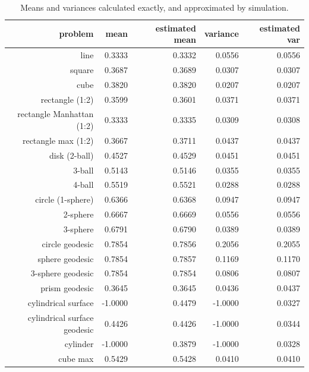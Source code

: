 \begin{table}[ht]
  \centering
  \begin{tabular}{r|rrrr}
                  problem &     mean & estimated mean & variance &  estimated var \\
     \hline 
                     line &   0.3333 &         0.3332 &   0.0556 &         0.0556 \\
                   square &   0.3687 &         0.3689 &   0.0307 &         0.0307 \\
                     cube &   0.3820 &         0.3820 &   0.0207 &         0.0207 \\
          rectangle (1:2) &   0.3599 &         0.3601 &   0.0371 &         0.0371 \\
rectangle Manhattan (1:2) &   0.3333 &         0.3335 &   0.0309 &         0.0308 \\
      rectangle max (1:2) &   0.3667 &         0.3711 &   0.0437 &         0.0437 \\
            disk (2-ball) &   0.4527 &         0.4529 &   0.0451 &         0.0451 \\
                   3-ball &   0.5143 &         0.5146 &   0.0355 &         0.0355 \\
                   4-ball &   0.5519 &         0.5521 &   0.0288 &         0.0288 \\
        circle (1-sphere) &   0.6366 &         0.6368 &   0.0947 &         0.0947 \\
                 2-sphere &   0.6667 &         0.6669 &   0.0556 &         0.0556 \\
                 3-sphere &   0.6791 &         0.6790 &   0.0389 &         0.0389 \\
          circle geodesic &   0.7854 &         0.7856 &   0.2056 &         0.2055 \\
          sphere geodesic &   0.7854 &         0.7857 &   0.1169 &         0.1170 \\
        3-sphere geodesic &   0.7854 &         0.7854 &   0.0806 &         0.0807 \\
           prism geodesic &   0.3645 &         0.3645 &   0.0436 &         0.0437 \\
      cylindrical surface &  -1.0000 &         0.4479 &  -1.0000 &         0.0327 \\
cylindrical surface geodesic &   0.4426 &         0.4426 &  -1.0000 &         0.0344 \\
                 cylinder &  -1.0000 &         0.3879 &  -1.0000 &         0.0328 \\
                 cube max &   0.5429 &         0.5428 &   0.0410 &         0.0410 \\
  \end{tabular}
  \caption{Means and variances calculated exactly, and approximated by simulation.}
  \label{tab:mean_var_estimates}
\end{table}






